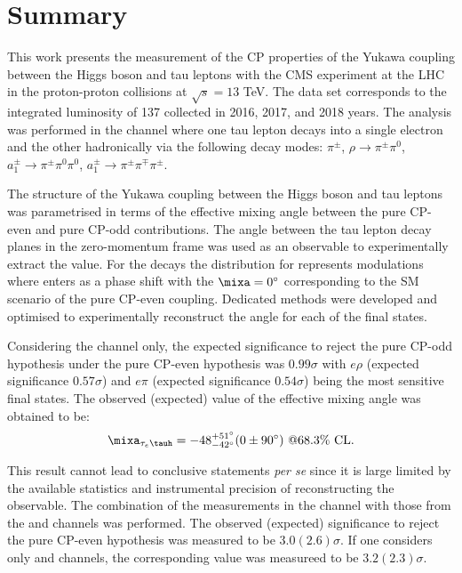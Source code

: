 \chapter{Summary}\label{sec:outro}

This work presents the measurement of the CP properties of the Yukawa coupling between the Higgs boson and tau leptons with the CMS experiment at the LHC in the proton-proton collisions at $\sqrt{s} = 13$ TeV. The data set corresponds to the integrated luminosity of 137 \ifb collected in 2016, 2017, and 2018 years. The analysis was performed in the \et channel where one tau lepton decays into a single electron and the other hadronically via the following decay modes: $\pi^\pm$, $\rho \to \pi^\pm \pi^0$, $a_1^\pm \to \pi^\pm\pi^0\pi^0$, $a_1^\pm \to \pi^\pm \pi^\mp \pi^\pm$. 

The structure of the Yukawa coupling between the Higgs boson and tau leptons was parametrised in terms of the effective mixing angle \mixa between the pure CP-even and pure CP-odd contributions. The angle between the tau lepton decay planes in the zero-momentum frame \phicp was used as an observable to experimentally extract the \mixa value. For the \htt decays the distribution for \phicp represents modulations where \mixa enters as a phase shift with the $\mixa=0^\circ$ corresponding to the SM scenario of the pure CP-even coupling. Dedicated methods were developed and optimised to experimentally reconstruct the \phicp angle for each of the final states.  

Considering the \et channel only, the expected significance to reject the pure CP-odd hypothesis under the pure CP-even hypothesis was $0.99\sigma$ with $e\rho$ (expected significance $0.57\sigma$) and $e\pi$ (expected significance $0.54\sigma$) being the most sensitive final states. The observed (expected) value of the effective mixing angle was obtained to be:
\begin{equation}
    \mixa_{\tau_e\tauh} = -48^{+51^\circ}_{-42^\circ}(0 \pm 90^\circ) ~@68.3\% \text{ CL}.
\end{equation}

This result cannot lead to conclusive statements \textit{per se} since it is large limited by the available statistics and instrumental precision of reconstructing the \phicp observable. The combination of the measurements in the \et channel with those from the \mt and \tata channels was performed. The observed (expected) significance to reject the pure CP-even hypothesis was measured to be $3.0 (2.6)\sigma$. If one considers only \mt and \tata channels, the corresponding value was measureed to be $3.2 (2.3)\sigma$. 

